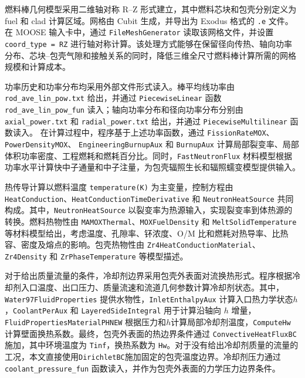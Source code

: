燃料棒几何模型采用二维轴对称 R--Z 形式建立，其中燃料芯块和包壳分别定义为 fuel 和 clad 计算区域。网格由 Cubit 生成，并导出为 Exodus 格式的 \texttt{.e} 文件。在 MOOSE 输入卡中，通过 \texttt{FileMeshGenerator} 读取该网格文件，并设置 \texttt{coord\_type = RZ} 进行轴对称计算。该处理方式能够在保留径向传热、轴向功率分布、芯块--包壳气隙和接触关系的同时，降低三维全尺寸燃料棒计算所需的网格规模和计算成本。

功率历史和功率分布均采用外部文件形式读入。棒平均线功率由
\texttt{rod\_\allowbreak ave\_\allowbreak lin\_\allowbreak pow.\allowbreak txt}
给出，并通过 \texttt{PiecewiseLinear} 函数
\texttt{rod\_\allowbreak ave\_\allowbreak lin\_\allowbreak pow\_\allowbreak fun}
读入；轴向功率分布和径向功率分布分别由
\texttt{axial\_\allowbreak power.\allowbreak txt}
和
\texttt{radial\_\allowbreak power.\allowbreak txt}
给出，并通过 \texttt{PiecewiseMultilinear} 函数读入。
在计算过程中，程序基于上述功率函数，通过
\texttt{Fission\allowbreak RateMOX}、\texttt{PowerDensityMOX}、
\texttt{EngineeringBurnupAux} 和 \texttt{BurnupAux}
计算局部裂变率、局部体积功率密度、工程燃耗和燃耗百分比。同时，\texttt{FastNeutronFlux} 材料模型根据功率水平计算快中子通量和中子注量，为包壳辐照生长和辐照蠕变模型提供输入。

热传导计算以燃料温度 \texttt{temperature(K)} 为主变量，控制方程由 \texttt{HeatConduction}、\texttt{HeatConductionTimeDerivative} 和 \texttt{NeutronHeatSource} 共同构成。其中，\texttt{NeutronHeat\allowbreak Source} 以裂变率为热源输入，实现裂变率到体热源的转换。燃料热物性由 \texttt{MAMOXThermal}、\texttt{MOXFuelDensity} 和 \texttt{MeltSolidTemperature} 等材料模型给出，考虑温度、孔隙率、钚浓度、O/M 比和燃耗对热导率、比热容、密度及熔点的影响。包壳热物性由 \texttt{Zr4Heat\allowbreak ConductionMaterial}、\texttt{Zr4Density} 和 \texttt{ZrPhaseTemperature} 等模型描述。

对于给出质量流量的条件，冷却剂边界采用包壳外表面对流换热形式。程序根据冷却剂入口温度、出口压力、质量流速和流道几何参数计算冷却剂状态。其中，\texttt{Water97\allowbreak FluidProperties} 提供水物性，\texttt{InletEnthalpyAux} 计算入口热力学状态$h$，\texttt{CoolantPerAux} 和 \texttt{LayeredSideIntegral} 用于计算沿轴向 $h$ 增量，\texttt{FluidPropertiesMaterialPHNEW} 根据压力和$h$计算局部冷却剂温度，\texttt{ComputeHw} 计算壁面换热系数。最终，包壳外表面的热边界条件通过 \texttt{Convective\allowbreak HeatFluxBC} 施加，其中环境温度为 \texttt{Tinf}，换热系数为 \texttt{Hw}。对于没有给出冷却剂质量的流量的工况，本文直接使用\texttt{DirichletBC}施加固定的包壳温度边界。冷却剂压力通过 \texttt{coolant\_pressure\_fun} 函数读入，并作为包壳外表面的力学压力边界条件。

